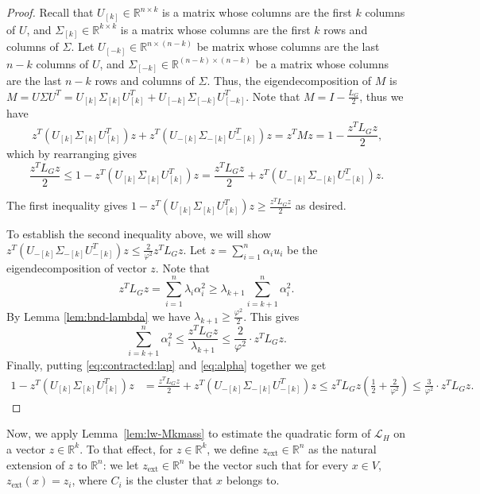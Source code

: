 \documentclass[letterpaper,11pt]{article}
\newcommand{\zext}{z_{\text{ext}}}
\newcommand{\R}{\mathbb{R}}
\theoremstyle{plain}
\theoremstyle{definition}
\theoremstyle{remark}
\begin{document}
\begin{proof}
Recall that $U_{[k]}\in \R^{n\times k}$ is a matrix whose columns are the first $k$ 
columns of $U$, and $\Sigma_{[k]}\in \R^{k\times k}$ is a matrix whose columns are the first $k$ rows and columns of $\Sigma$. 
Let $U_{[-k]}\in \R^{n\times (n-k)}$ be matrix whose columns are the last $n-k$ 
columns of $U$, and $\Sigma_{[-k]}\in \R^{(n-k)\times (n-k)}$ be a matrix whose columns are the last $n-k$ rows and columns of $\Sigma$. Thus, the eigendecomposition of $M$ is $M=U\Sigma U^T= U_{[k]}\Sigma_{[k]} U_{[k]}^T + U_{[-k]}\Sigma_{[-k]} U_{[-k]}^T$.
Note that $M = I - \frac{L_G}{2}$,  thus we have
\begin{equation}
		\label{eq:mass-bottom}
		 z^T (U_{[k]}\Sigma_{[k]} U_{[k]}^T) z + z^T (U_{-[k]}\Sigma_{-[k]} U_{-[k]}^T) z = z^T M z= 1-\frac{z^T L_G z}{2}\text{,}
	\end{equation}
which by rearranging gives
	\begin{equation}
		\label{eq:contracted:lap}
		\frac{z^T L_G z}{2} \leq 1 - z^T (U_{[k]}\Sigma_{[k]} U_{[k]}^T) z = \frac{z^T L_G z}{2} + z^T (U_{-[k]}\Sigma_{-[k]} U_{-[k]}^T) z.
	\end{equation}

	The first inequality gives $1 - z^T (U_{[k]} \Sigma_{[k]} U_{[k]}^T) z \geq \frac{z^T L_G z}{2}$ as desired.
	
	To establish the second inequality above, we will show 
	$z^T (U_{-[k]} \Sigma_{-[k]} U_{-[k]}^T) z \leq \frac{2}{\varphi^2} z^T L_G z$.
	Let $z=\sum_{i=1}^n \alpha_i u_i$ be the eigendecomposition of vector $z$. Note that
	\[ z^T L_G z = \sum_{i=1}^n \lambda_i \alpha_i^2
	\geq \lambda_{k+1} \sum_{i=k+1}^n  \alpha_i^2.  \]
	By Lemma \ref{lem:bnd-lambda} we have $\lambda_{k+1}\geq \frac{\varphi^2}{2}$. This gives
	\begin{equation}
		\label{eq:alpha}
		\sum_{i=k+1}^n  \alpha_i^2 \leq \frac{z^T L_G z }{\lambda_{k+1}} \leq \frac{2}{\varphi^2}\cdot z^T L_G z.
	\end{equation}
Finally, putting \eqref{eq:contracted:lap} and \eqref{eq:alpha} together we get
	\begin{align*}
		1-z^T (U_{[k]}\Sigma_{[k]} U_{[k]}^T) z &= \frac{z^T L_G z}{2} + z^T (U_{-[k]}\Sigma_{-[k]} U_{-[k]}^T) z \leq z^T L_G z\left(\frac{1}{2}+\frac{2}{\varphi^2} \right) \leq \frac{3}{\varphi^2}\cdot  z^T L_G z \text{.}
	\end{align*}
\end{proof}

Now, we apply Lemma~\ref{lem:lw-Mkmass} to estimate the quadratic form of $\mathcal{L}_H$ on a vector $z\in \R^k$. To that effect, for $z \in \R^k$, we define $\zext \in \R^n$ as the natural extension of $z$ to $\R^n$: we let $\zext\in \R^n$ be the vector such that for every $x\in V$,  $\zext(x) = z_i$, where $C_i$ is the cluster that $x$ belongs to.  
\end{document}
